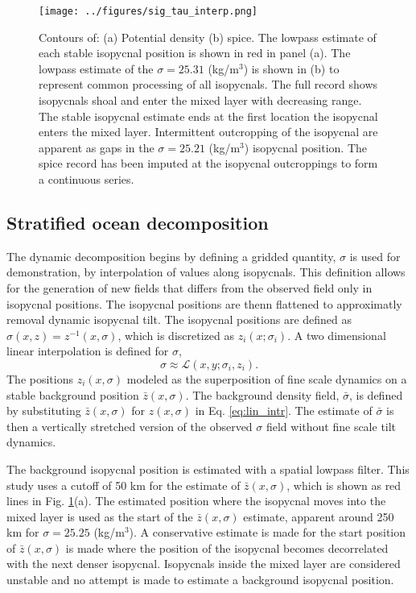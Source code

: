 \documentclass[preprint,NumberedRefs]{JASA}
\begin{document}
\begin{figure}
\texttt{[image: ../figures/sig\_tau\_interp.png]}
    \caption{\label{fig:cntrs}{Contours of: (a) Potential density (b) spice. The lowpass estimate of each stable isopycnal position is shown in red in panel (a). The lowpass estimate of the $\sigma=25.31$ (kg/m$^3$) is shown in (b) to represent common processing of all isopycnals. The full record shows isopycnals shoal and enter the mixed layer with decreasing range. The stable isopycnal estimate ends at the first location the isopycnal enters the mixed layer. Intermittent outcropping of the isopycnal are apparent as gaps in the $\sigma=25.21$ (kg/m$^3$) isopycnal position. The spice record has been imputed at the isopycnal outcroppings to form a continuous series.}}
\end{figure}

\subsection{Stratified ocean decomposition}
The dynamic decomposition begins by defining a gridded quantity, $\sigma$ is used for demonstration, by interpolation of values along isopycnals. This definition allows for the generation of new fields that differs from the observed field only in isopycnal positions. The isopycnal positions are thenn flattened to approximatly removal dynamic isopycnal tilt. The isopycnal positions are defined as $\sigma(x, z) = z^{-1}(x, \sigma)$, which is discretized as $z_i(x; \sigma_i)$. A two dimensional linear interpolation is defined for $\sigma$,
\begin{equation}
    \sigma\approx\mathcal{L}(x, y; \sigma_i, z_i).
    \label{eq:lin_intr}
\end{equation}
The positions $z_i(x, \sigma)$ modeled as the superposition of fine scale dynamics on a stable background position $\bar{z}(x, \sigma)$. The background density field, $\bar{\sigma}$, is defined by substituting $\bar{z}(x, \sigma)$ for $z(x, \sigma)$ in Eq. \eqref{eq:lin_intr}. The estimate of $\bar{\sigma}$ is then a vertically stretched version of the observed $\sigma$ field without fine scale tilt dynamics.

The background isopycnal position is estimated with a spatial lowpass filter. This study uses a cutoff of 50 km for the estimate of $\bar{z}(x, \sigma)$, which is shown as red lines in Fig. \ref{fig:cntrs}(a). The estimated position where the isopycnal moves into the mixed layer is used as the start of the $\bar{z}(x, \sigma)$ estimate, apparent around 250 km for $\sigma=25.25$ (kg/m$^3$). A conservative estimate is made for the start position of $\bar{z}(x, \sigma)$ is made where the position of the isopycnal becomes decorrelated with the next denser isopycnal. Isopycnals inside the mixed layer are considered unstable and no attempt is made to estimate a background isopycnal position.
\end{document}

